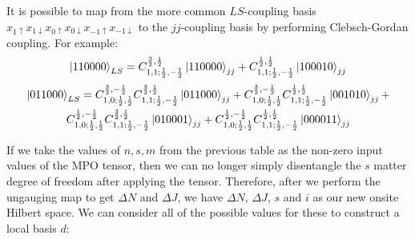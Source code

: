 \documentclass{article}
\begin{document}
It is possible to map from the more common $LS$-coupling basis $x_{1\uparrow}x_{1\downarrow}x_{0\uparrow}x_{0\downarrow}x_{-1\uparrow}x_{-1\downarrow}$ to the $jj$-coupling basis by performing Clebsch-Gordan coupling. For example:
\begin{equation}
    \ket{110000}_{LS} = C_{1,1;\frac{1}{2},-\frac{1}{2}}^{\frac{3}{2},\frac{1}{2}}\ket{110000}_{jj} + C_{1,1;\frac{1}{2},-\frac{1}{2}}^{\frac{1}{2},\frac{1}{2}}\ket{100010}_{jj}
\end{equation}
\begin{multline}
    \ket{011000}_{LS} = C_{1,0;\frac{1}{2},\frac{1}{2}}^{\frac{3}{2},-\frac{1}{2}}C_{1,1;\frac{1}{2},-\frac{1}{2}}^{\frac{3}{2},\frac{1}{2}}\ket{011000}_{jj} + C_{1,0;\frac{1}{2},\frac{1}{2}}^{\frac{3}{2},-\frac{1}{2}}C_{1,1;\frac{1}{2},-\frac{1}{2}}^{\frac{1}{2},\frac{1}{2}}\ket{001010}_{jj} +\\ C_{1,0;\frac{1}{2},\frac{1}{2}}^{\frac{1}{2},-\frac{1}{2}}C_{1,1;\frac{1}{2},-\frac{1}{2}}^{\frac{3}{2},\frac{1}{2}}\ket{010001}_{jj}+ C_{1,0;\frac{1}{2},\frac{1}{2}}^{\frac{1}{2},-\frac{1}{2}}C_{1,1;\frac{1}{2},-\frac{1}{2}}^{\frac{1}{2},\frac{1}{2}}\ket{000011}_{jj}
\end{multline}

If we take the values of $n,s,m$ from the previous table as the non-zero input values of the MPO tensor, then we can no longer simply disentangle the $s$ matter degree of freedom after applying the tensor. Therefore, after we perform the ungauging map to get $\Delta N$ and $\Delta J$, we have $\Delta N$, $\Delta J$, $s$ and $i$ as our new onsite Hilbert space. We can consider all of the possible values for these to construct a local basis $d$:
\end{document}
